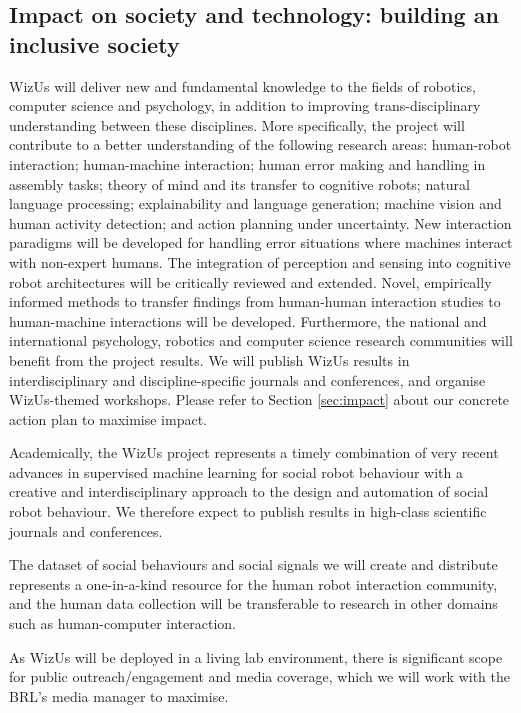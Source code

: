 \documentclass[11pt,a4paper]{report}
\newcommand{\project}{WizUs\xspace}
\begin{document}
\subsection{Impact on society and technology: building an inclusive society}


\project will deliver new and fundamental knowledge to the fields of robotics,
computer science and psychology, in addition to improving trans-disciplinary
understanding between these disciplines. More specifically, the project will
contribute to a better understanding of the following research areas:
human-robot interaction; human-machine interaction; human error making and
handling in assembly tasks; theory of mind and its transfer to cognitive robots;
natural language processing; explainability and language generation; machine
vision and human activity detection; and action planning under uncertainty. New
interaction paradigms will be developed for handling error situations where
machines interact with non-expert humans. The integration of perception and
sensing into cognitive robot architectures will be critically reviewed and
extended. Novel, empirically informed methods to transfer findings from
human-human interaction studies to human-machine interactions will be developed.
Furthermore, the national and international psychology, robotics and computer
science research communities will benefit from the project results. We will
publish \project results in interdisciplinary and discipline-specific journals
and conferences, and organise \project-themed workshops. Please refer to Section
\ref{sec:impact} about our concrete action plan to maximise impact. 




Academically, the \project project represents a timely combination of
very recent advances in supervised machine learning for social robot
behaviour with a creative and interdisciplinary approach to the design
and automation of social robot behaviour. We therefore expect to publish
results in high-class scientific journals and conferences.

The dataset of social behaviours and social signals we will create and
distribute represents a one-in-a-kind resource for the human robot
interaction community, and the human data collection will be
transferable to research in other domains such as human-computer
interaction.

As \project will be deployed in a living lab environment, there is
significant scope for public outreach/engagement and media coverage,
which we will work with the BRL's media manager to maximise.
\end{document}
